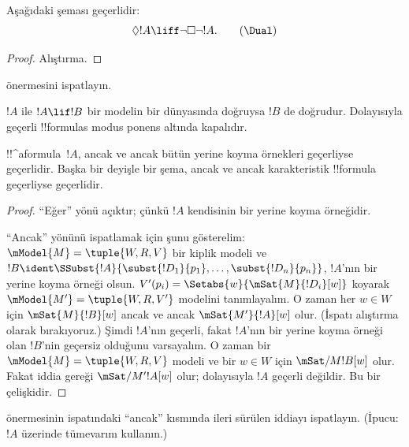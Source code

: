\begin{prop}
  Aşağıdaki \Dual{} şeması geçerlidir:
  \begin{equation*}
  \Diamond !A \liff \lnot\Box\lnot !A. \tag{\Dual}
  \end{equation*}
\end{prop}

\begin{proof}
  Alıştırma.
\end{proof}

\begin{prob}
   önermesini ispatlayın.
\end{prob}

\begin{prop}
  $!A$ ile $!A \lif !B$ bir modelin bir dünyasında doğruysa $!B$ de
  doğrudur. Dolayısıyla geçerli !!{formula}s modus ponens altında kapalıdır.
\end{prop}

\begin{prop}
  !!^a{formula}~$!A$, ancak ve ancak bütün yerine koyma örnekleri geçerliyse
  geçerlidir. Başka bir deyişle bir şema, ancak ve ancak karakteristik
  !!{formula} geçerliyse geçerlidir.
\end{prop}

\begin{proof}
  ``Eğer'' yönü açıktır; çünkü $!A$ kendisinin bir yerine koyma örneğidir.

  ``Ancak'' yönünü ispatlamak için şunu gösterelim: $\mModel{M} =
  \tuple{W, R, V}$ bir kiplik modeli ve $!B \ident
  \SSubst{!A}{\subst{!D_1}{p_1},\dots,\subst{!D_n}{p_n}}$, $!A$'nın bir
  yerine koyma örneği olsun. $V'(p_i) =
  \Setabs{w}{\mSat{M}{!D_i}[w]}$ koyarak $\mModel{M'} = \tuple{W, R,
    V'}$ modelini tanımlayalım. O zaman her $w \in W$ için
  $\mSat{M}{!B}[w]$ ancak ve ancak $\mSat{M'}{!A}[w]$ olur. (İspatı
  alıştırma olarak bırakıyoruz.) Şimdi $!A$'nın geçerli, fakat $!A$'nın bir
  yerine koyma örneği olan $!B$'nin geçersiz olduğunu varsayalım. O zaman
  bir $\mModel{M} = \tuple{W, R, V}$ modeli ve bir $w \in W$ için
  $\mSat/{M}{!B}[w]$ olur. Fakat iddia gereği
  $\mSat/{M'}{!A}[w]$ olur; dolayısıyla $!A$ geçerli değildir. Bu bir
  çelişkidir.
\end{proof}

\begin{prob}
   önermesinin ispatındaki
  ``ancak'' kısmında ileri sürülen iddiayı ispatlayın. (İpucu: $!A$ üzerinde
  tümevarım kullanın.)
\end{prob}

